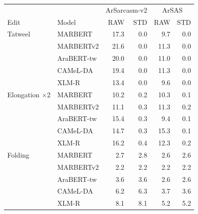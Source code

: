 \begin{tabular}{llrrrr}
\toprule
 & & \multicolumn{2}{c}{ArSarcasm-v2} & \multicolumn{2}{c}{ArSAS} \\
Edit & Model & RAW & STD & RAW & STD \\
\midrule
Tatweel & MARBERT & 17.3 & 0.0 & 9.7 & 0.0 \\
 & MARBERTv2 & 21.6 & 0.0 & 11.3 & 0.0 \\
 & AraBERT-tw & 20.0 & 0.0 & 11.0 & 0.0 \\
 & CAMeL-DA & 19.4 & 0.0 & 11.3 & 0.0 \\
 & XLM-R & 13.4 & 0.0 & 9.6 & 0.0 \\
\midrule
Elongation $\times$2 & MARBERT & 10.2 & 0.2 & 10.3 & 0.1 \\
 & MARBERTv2 & 11.1 & 0.3 & 11.3 & 0.2 \\
 & AraBERT-tw & 15.4 & 0.3 & 9.4 & 0.1 \\
 & CAMeL-DA & 14.7 & 0.3 & 15.3 & 0.1 \\
 & XLM-R & 16.2 & 0.4 & 12.3 & 0.2 \\
\midrule
Folding & MARBERT & 2.7 & 2.8 & 2.6 & 2.6 \\
 & MARBERTv2 & 2.2 & 2.2 & 2.2 & 2.2 \\
 & AraBERT-tw & 3.6 & 3.6 & 2.6 & 2.6 \\
 & CAMeL-DA & 6.2 & 6.3 & 3.7 & 3.6 \\
 & XLM-R & 8.1 & 8.1 & 5.2 & 5.2 \\
\bottomrule
\end{tabular}

